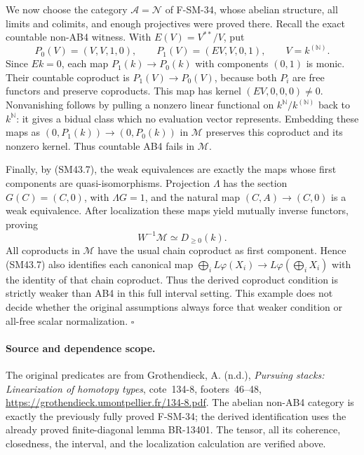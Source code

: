 We now choose the category \(\mathcal A=\mathcal N\) of
F-SM-34, whose abelian structure, all limits and colimits, and
enough projectives were proved there.  Recall the exact
countable non-AB4 witness.  With \(E(V)=V^{**}/V\), put
\[
 P_0(V)=(V,V,1,0),\qquad
 P_1(V)=(EV,V,0,1),\qquad V=k^{(\mathbb N)}.
\]
Since \(Ek=0\), each map
\(P_1(k)\to P_0(k)\) with components \((0,1)\) is monic.
Their countable coproduct is \(P_1(V)\to P_0(V)\), because
both \(P_i\) are free functors and preserve coproducts.
This map has kernel \((EV,0,0,0)\ne0\).  Nonvanishing follows
by pulling a nonzero linear functional on
\(k^{\mathbb N}/k^{(\mathbb N)}\) back to \(k^{\mathbb N}\):
it gives a bidual class which no evaluation vector represents.
Embedding these maps as \((0,P_1(k))\to(0,P_0(k))\) in
\(\mathcal M\) preserves this coproduct and its nonzero kernel.
Thus countable AB4 fails in \(\mathcal M\).

Finally, by (SM43.7), the weak equivalences are exactly the
maps whose first components are quasi-isomorphisms.
Projection \(\Lambda\) has the section \(G(C)=(C,0)\), with
\(\Lambda G=1\), and the natural map
\((C,A)\to(C,0)\) is a weak equivalence.  After localization
these maps yield mutually inverse functors, proving
\[
                     W^{-1}\mathcal M\simeq D_{\ge0}(k).
                                                               \tag{SM43.10}
\]
All coproducts in \(\mathcal M\) have the usual chain
coproduct as first component.  Hence (SM43.7) also identifies
each canonical map
\(\bigoplus_iL\varphi(X_i)\to
L\varphi(\bigoplus_iX_i)\) with the identity of that chain
coproduct.  Thus the derived coproduct condition is strictly
weaker than AB4 in this full interval setting.  This example
does not decide whether the original assumptions always force
that weaker condition or all-free scalar normalization.
\(\square\)

\paragraph{Source and dependence scope.}
The original predicates are from Grothendieck, A. (n.d.),
\emph{Pursuing stacks: Linearization of homotopy types},
cote~134-8, footers~46--48,
\url{https://grothendieck.umontpellier.fr/134-8.pdf}.
The abelian non-AB4 category is exactly the previously
fully proved F-SM-34; the derived identification uses the
already proved finite-diagonal lemma BR-13401.  The tensor,
all its coherence, closedness, the interval, and the
localization calculation are verified above.
